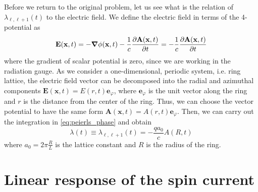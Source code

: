 Before we return to the original problem, let us see what is the relation of \(\lambda_{\ell,\ell+1}(t)\)  to the electric field.
We define the electric field in terms of the 4-potential as
\begin{equation}
    \mathbf{E}(\mathbf{x},t) = -\grad{\phi(\mathbf{x},t)} - \frac{1}{c} \pdv{\mathbf{A}(\mathbf{x},t)}{t}
    = -\frac{1}{c} \pdv{\mathbf{A} (\mathbf{x},t)}{t}
\end{equation}
where the gradient of scalar potential is zero, since we are working in the radiation gauge.
As we consider a one-dimensional, periodic system, i.e. ring lattice, the electric field vector can be decomposed into
the radial and azimuthal components \(\mathbf{E} (\mathbf{x} ,t) = E(r,t)\mathbf{e}_{\varphi}\), where
\(\mathbf{e}_{\varphi }\) is the unit vector along the ring and \(r\) is the distance from the center of the ring.
Thus, we can choose the vector potential to have the same form \(\mathbf{A}(\mathbf{x},t) = A(r,t)\mathbf{e}_{\varphi}\).
Then, we can carry out the integration in \eqref{eq:peierls_phase} and obtain
\begin{equation}
    \lambda(t) \equiv \lambda_{\ell,\ell+1}(t) = -\frac{q a_0}{c} A(R,t)
\end{equation}
where \(a_0 = 2\pi \frac{R}{L}\) is the lattice constant and \(R\) is the radius of the ring.

\section{Linear response of the spin current}

